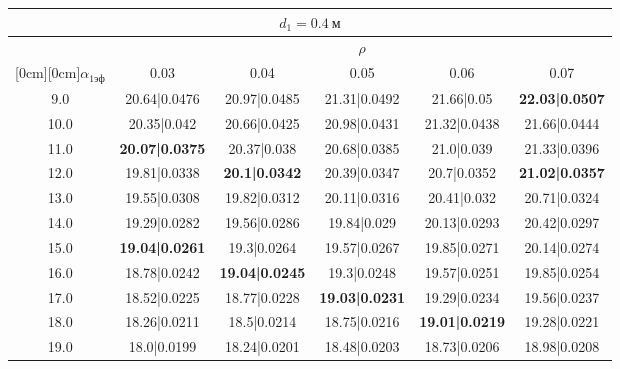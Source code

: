 \documentclass[20pt]{article}
\begin{document}
\begin{center}
\begin{tabular}{c|ccccc}
\hline
	\multicolumn{6}{c}{$d_{1}=0.4 \ м$} \\
\hline
	 & \multicolumn{5}{|c}{$\rho$} \\
	\cline{2-6}
	\raisebox{1.5ex}[0cm][0cm]{$\alpha_{1эф}$} & 0.03 & 0.04 & 0.05 & 0.06 & 0.07\\
\hline
	9.0 & 	20.64|0.0476 & 	20.97|0.0485 & 	21.31|0.0492 & 	21.66|0.05 & 	\textbf{22.03|0.0507}\\
	10.0 & 	20.35|0.042 & 	20.66|0.0425 & 	20.98|0.0431 & 	21.32|0.0438 & 	21.66|0.0444\\
	11.0 & 	\textbf{20.07|0.0375} & 	20.37|0.038 & 	20.68|0.0385 & 	21.0|0.039 & 	21.33|0.0396\\
	12.0 & 	19.81|0.0338 & 	\textbf{20.1|0.0342} & 	20.39|0.0347 & 	20.7|0.0352 & 	\textbf{21.02|0.0357}\\
	13.0 & 	19.55|0.0308 & 	19.82|0.0312 & 	20.11|0.0316 & 	20.41|0.032 & 	20.71|0.0324\\
	14.0 & 	19.29|0.0282 & 	19.56|0.0286 & 	19.84|0.029 & 	20.13|0.0293 & 	20.42|0.0297\\
	15.0 & 	\textbf{19.04|0.0261} & 	19.3|0.0264 & 	19.57|0.0267 & 	19.85|0.0271 & 	20.14|0.0274\\
	16.0 & 	18.78|0.0242 & 	\textbf{19.04|0.0245} & 	19.3|0.0248 & 	19.57|0.0251 & 	19.85|0.0254\\
	17.0 & 	18.52|0.0225 & 	18.77|0.0228 & 	\textbf{19.03|0.0231} & 	19.29|0.0234 & 	19.56|0.0237\\
	18.0 & 	18.26|0.0211 & 	18.5|0.0214 & 	18.75|0.0216 & 	\textbf{19.01|0.0219} & 	19.28|0.0221\\
	19.0 & 	18.0|0.0199 & 	18.24|0.0201 & 	18.48|0.0203 & 	18.73|0.0206 & 	18.98|0.0208\\
\end{tabular}


\end{center}
\end{document}
